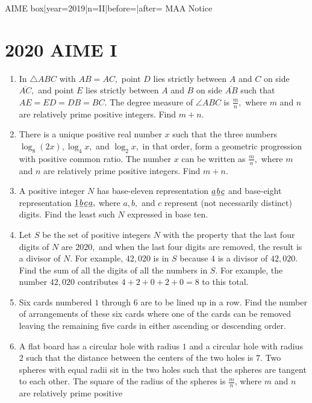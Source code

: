 \documentclass{article}
\begin{document}
\begin{enumerate}[label=\arabic*., itemsep=0.5em]
{{AIME box|year=2019|n=II|before=|after=}}
{{MAA Notice}}\par \vspace{0.5em}\end{enumerate}\newpage\section*{2020 AIME I}\begin{enumerate}[label=\arabic*., itemsep=0.5em]\item In $\triangle ABC$ with $AB=AC,$ point $D$ lies strictly between $A$ and $C$ on side $\overline{AC},$ and point $E$ lies strictly between $A$ and $B$ on side $\overline{AB}$ such that $AE=ED=DB=BC.$ The degree measure of $\angle ABC$ is $\tfrac{m}{n},$ where $m$ and $n$ are relatively prime positive integers. Find $m+n.$\par \vspace{0.5em}\item There is a unique positive real number $x$ such that the three numbers $\log_8(2x),\log_4x,$ and $\log_2x,$ in that order, form a geometric progression with positive common ratio. The number $x$ can be written as $\tfrac{m}{n},$ where $m$ and $n$ are relatively prime positive integers. Find $m+n.$\par \vspace{0.5em}\item A positive integer $N$ has base-eleven representation $\underline{a}\kern 0.1em\underline{b}\kern 0.1em\underline{c}$ and base-eight representation $\underline1\kern 0.1em\underline{b}\kern 0.1em\underline{c}\kern 0.1em\underline{a},$ where $a,b,$ and $c$ represent (not necessarily distinct) digits. Find the least such $N$ expressed in base ten.\par \vspace{0.5em}\item Let $S$ be the set of positive integers $N$ with the property that the last four digits of $N$ are $2020,$ and when the last four digits are removed, the result is a divisor of $N.$ For example, $42{,}020$ is in $S$ because $4$ is a divisor of $42{,}020.$ Find the sum of all the digits of all the numbers in $S.$ For example, the number $42{,}020$ contributes $4+2+0+2+0=8$ to this total.\par \vspace{0.5em}\item Six cards numbered $1$ through $6$ are to be lined up in a row. Find the number of arrangements of these six cards where one of the cards can be removed leaving the remaining five cards in either ascending or descending order.\par \vspace{0.5em}\item A flat board has a circular hole with radius $1$ and a circular hole with radius $2$ such that the distance between the centers of the two holes is $7$. Two spheres with equal radii sit in the two holes such that the spheres are tangent to each other. The square of the radius of the spheres is $\tfrac{m}{n}$, where $m$ and $n$ are relatively prime positive 
\end{enumerate}
\end{document}
